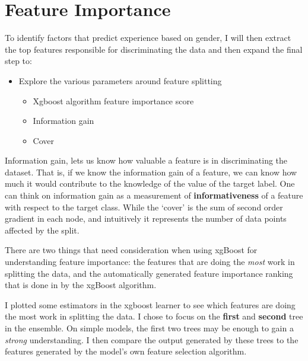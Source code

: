 \section*{Feature Importance}
To identify factors that predict experience based on gender, I will then extract the top features responsible for discriminating the data and then expand the final step to:
\begin{itemize}
\item Explore the various parameters around feature splitting
    \begin{itemize}
        \item Xgboost algorithm feature importance score
        \item Information gain
        \item Cover
    \end{itemize}
\end{itemize}


Information gain, lets us know how valuable a feature is in discriminating the dataset. That is, if we know the information gain of a feature, we can know how much it would contribute to the knowledge of the value of the target label. One can think on information gain as a measurement of \textbf{informativeness} of a feature with respect to the target class. While the `cover' is the sum of second order gradient in each node, and intuitively it represents the number of data points affected by the split.

There are two things that need consideration when using xgBoost for understanding feature importance: the features that are doing the \emph{most} work in splitting the data, and the automatically generated feature importance ranking that is done in by the xgBoost algorithm.

I plotted some estimators in the xgboost learner to see which features are doing the most work in splitting the data. I chose to focus on the \textbf{first} and \textbf{second} tree in the ensemble. On simple models, the first two trees may be enough to gain a \textit{strong} understanding. I then compare the output generated by these trees to the features generated by the model's own feature selection algorithm. 



